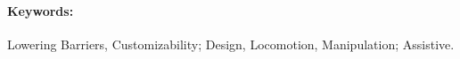 \documentclass[11pt]{article}
\begin{document}

\paragraph{Keywords:} 
Lowering Barriers,
Customizability; 
Design, 
Locomotion, 
Manipulation;
Assistive.
\end{document}

